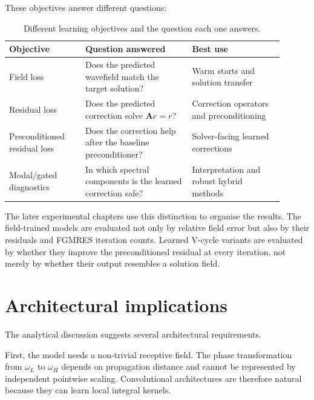 These objectives answer different questions:
\begin{table}[htbp]
    \centering
    \caption{Different learning objectives and the question each one answers.}
    \label{tab:ch5-objectives}
    \begin{tabular}{@{}p{0.25\linewidth}p{0.35\linewidth}p{0.30\linewidth}@{}}
        \toprule
        Objective & Question answered & Best use \\
        \midrule
        Field loss
        & Does the predicted wavefield match the target solution?
        & Warm starts and solution transfer \\
        Residual loss
        & Does the predicted correction solve $\mathbf{A}e=r$?
        & Correction operators and preconditioning \\
        Preconditioned residual loss
        & Does the correction help after the baseline preconditioner?
        & Solver-facing learned corrections \\
        Modal/gated diagnostics
        & In which spectral components is the learned correction safe?
        & Interpretation and robust hybrid methods \\
        \bottomrule
    \end{tabular}
\end{table}

The later experimental chapters use this distinction to organise the results.
The field-trained models are evaluated not only by relative field error but
also by their residuals and FGMRES iteration counts. Learned V-cycle variants
are evaluated by whether they improve the preconditioned residual at every
iteration, not merely by whether their output resembles a solution field.

\section{Architectural implications}
\label{sec:ch5-architecture-implications}

The analytical discussion suggests several architectural requirements.

First, the model needs a non-trivial receptive field. The phase transformation
from $\omega_L$ to $\omega_H$ depends on propagation distance and cannot be
represented by independent pointwise scaling. Convolutional architectures are
therefore natural because they can learn local integral kernels.

